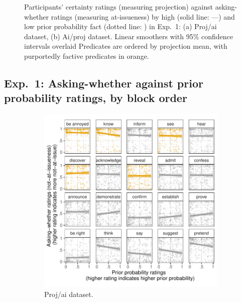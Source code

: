 \documentclass[11pt,fleqn]{article}
\newcommand{\6}{\mbox{$[\hspace*{-.6mm}[$}}
\newcommand{\9}{\mbox{$]\hspace*{-.6mm}]$}}
\begin{document}
\begin{figure}[h!]
  
\caption{Participants' certainty ratings (measuring projection) against asking-whether ratings (measuring at-issueness) by high (solid line: ---) and low prior probability fact (dotted line: \raisebox{1mm}{\ldots}) in Exp.~1: (a) Proj/ai dataset, (b) Ai/proj dataset. Linear smoothers with 95\% confidence intervals overlaid Predicates are ordered by projection mean, with purportedly factive predicates in orange.}
\end{figure}

\newpage

\subsection{Exp.~1: Asking-whether against prior probability ratings, by block order}

\begin{figure}[h!]
\centering
\begin{subfigure}[t]{0.49\textwidth}
\centering
\includegraphics[width=.9\textwidth]{../../results/exp1/graphs/SUP-projai-ai-by-prior}
\caption{Proj/ai dataset.}
\end{subfigure} \hfill \begin{subfigure}[t]{0.49\textwidth}
\centering

\end{subfigure}
\end{figure}
\end{document}
